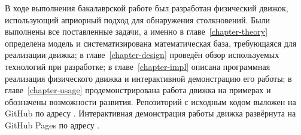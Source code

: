 
В ходе выполнения бакалаврской работе был разработан
физический движок, использующий априорный подход для обнаружения столкновений.
Были выполнены все поставленные задачи, а именно
в главе~\ref{chapter-theory} определена модель и систематизирована математическая база, требующаяся для реализации движка;
в главе~\ref{chapter-design} проведён обзор используемых технологий при разработке;
в главе~\ref{chapter-impl} описана программная реализация физического движка и интерактивной демонстрацию его работы;
в главе~\ref{chapter-usage} продемонстрирована работа движка на примерах и обозначены возможности развития.
Репозиторий с исходным кодом выложен на GitHub по адресу
\underline{}.
Интерактивная демонстрация работы движка развёрнута на GitHub Pages по адресу
\underline{}.

\TODO
